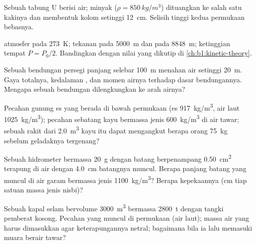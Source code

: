 \begin{exercise}[$\star$]\label{exo:b1:fluid-statics:4}
Sebuah tabung U berisi air; minyak ($\rho = \qty{850}{kg/m^3}$) dituangkan ke
salah satu kakinya dan membentuk kolom setinggi \qty{12}{cm}. Selisih tinggi kedua
permukaan bebasnya.
\end{exercise}

\begin{exercise}[$\star\star$]\label{exo:b1:fluid-statics:5}
 atmosfer pada \qty{273}{K}; tekanan pada \qty{5000}{m}
dan pada \qty{8848}{m}; ketinggian tempat $P = P_0/2$. Bandingkan dengan
nilai yang dikutip di \cref{ch:b1:kinetic-theory}.
\end{exercise}

\begin{exercise}[$\star\star$]\label{exo:b1:fluid-statics:6}
Sebuah bendungan persegi panjang selebar \qty{100}{m} menahan air setinggi \qty{20}{m}. Gaya
totalnya, kedalaman , dan momen airnya
terhadap dasar bendungannya. Mengapa sebuah bendungan dilengkungkan ke arah airnya?
\end{exercise}

\begin{exercise}[$\star\star$]\label{exo:b1:fluid-statics:7}
Pecahan gunung es yang berada di bawah permukaan (es \qty{917}{kg/m^3}, air laut
\qty{1025}{kg/m^3}); pecahan sebatang kayu bermassa jenis \qty{600}{kg/m^3} di air tawar;
sebuah rakit dari \qty{2.0}{m^3} kayu itu dapat mengangkut berapa orang \qty{75}{kg}
sebelum geladaknya tergenang?
\end{exercise}

\begin{exercise}[$\star\star$]\label{exo:b1:fluid-statics:8}
Sebuah hidrometer bermassa \qty{20}{g} dengan batang berpenampang
\qty{0.50}{cm^2} terapung di air dengan \qty{4.0}{cm} batangnya muncul.
Berapa panjang batang yang muncul di air garam bermassa jenis \qty{1100}{kg/m^3}? Berapa kepekaannya
(cm tiap satuan massa jenis nisbi)?
\end{exercise}

\begin{exercise}[$\star\star$]\label{exo:b1:fluid-statics:9}
Sebuah kapal selam bervolume \qty{3000}{m^3} bermassa \qty{2800}{t} dengan tangki
pemberat kosong. Pecahan yang muncul di permukaan (air laut); massa
air yang harus dimasukkan agar keterapungannya netral; bagaimana bila ia lalu memasuki
muara berair tawar?
\end{exercise}

